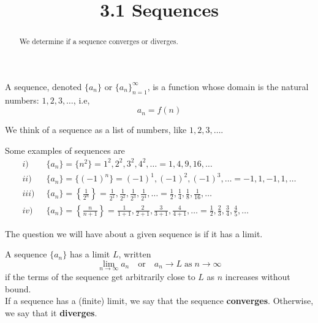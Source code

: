\documentclass[handout]{ximera}
\title{3.1 Sequences}
\begin{document}
\begin{abstract}
We determine if a sequence converges or diverges.
\end{abstract}

\maketitle

\begin{definition}[Sequence]
A sequence, denoted $\displaystyle \{a_n\}$ or $\displaystyle \{a_n\}_{n=1}^\infty$, is a function whose domain is the natural numbers: $1, 2, 3, \dots$, i.e,
\[
a_n = f(n)
\]
\end{definition}
We think of a sequence as a list of numbers, like $1, 2, 3, \dots$.

Some examples of sequences are
\begin{align*}
i) \;\; &  \{a_n\} = \{n^2\} = 1^2, 2^2, 3^2, 4^2, \dots = 1, 4, 9, 16,  \dots\\
ii) \;\; &  \{a_n\} = \{(-1)^n\} = (-1)^1, (-1)^2, (-1)^3, \dots = -1, 1, -1, 1, \dots\\
iii) \;\; &  \{a_n\} = \left\{\frac{1}{2^n}\right\} = \frac{1}{2^1}, \frac{1}{2^2}, \frac{1}{2^3}, \frac{1}{2^4}, \dots = \frac12, \frac14, \frac18, \frac{1}{16}, \dots\\
iv) \;\; &   \{a_n\} = \left\{\frac{n}{n+1}\right\} = \frac{1}{1+1}, \frac{2}{2+1}, \frac{3}{3+1}, \frac{4}{4+1}, \dots = \frac12, \frac23, \frac34, \frac45, \dots
\end{align*}

The question we will have about a given sequence is if it has a limit.

\begin{definition}
A sequence $\{a_n\}$ has a limit $L$, written
\[
\lim_{n \to \infty} a_n \quad \mbox{or} \quad a_n \to L \; \mbox{as} \; n \to \infty
\]
if the terms of the sequence get arbitrarily close to $L$ as $n$ increases without bound.\\
If a sequence has a (finite) limit, we say that the sequence {\bf converges}.  Otherwise, we say that it {\bf diverges}.
\end{definition}
\end{document}
